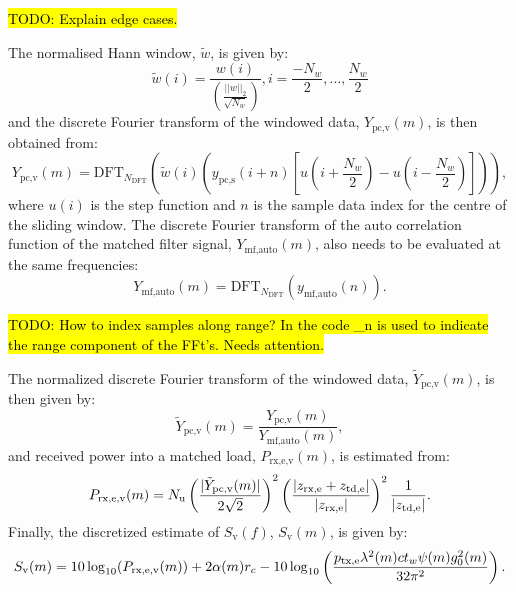 \documentclass[preprint,12pt,TurnOnLineNumbers]{JASAnew}
\newcommand{\freqsym}{f}
\newcommand{\samplesymt}{n}
\newcommand{\samplesymf}{m}
\newcommand{\genidxsym}{i}
\newcommand{\nchannels}{N_{\textrm{u}}}
\newcommand{\zrxe}{z_{\textrm{rx,e}}}
\newcommand{\ztde}{z_{\textrm{td,e}}}
\newcommand{\ptxe}{p_{\textrm{tx,e}}}
\newcommand{\ypcspread}{y_{\textrm{pc,s}}}
\newcommand{\ymfauto}{y_{\textrm{mf,auto}}}
\newcommand{\ypcvolumef}{Y_{\textrm{pc,v}}}
\newcommand{\ypcvolumenormf}{\tilde{Y}_{\textrm{pc,v}}}
\newcommand{\ymfautof}{Y_{\textrm{mf,auto}}}
\newcommand{\prxevf}{P_{\textrm{rx,e,v}}}
\newcommand{\hannw}{w}
\newcommand{\hannwnorm}{\tilde{\hannw}}
\newcommand{\nw}{N_{\hannw}}
\newcommand{\tslide}{t_w}
\newcommand{\sv}{S_{\textrm{v}}}
\newcommand{\range}{r}
\newcommand{\gainzero}{g_0}
\newcommand{\eqang}{\psi}
\newcommand{\wlen}{\lambda}
\newcommand{\cw}{c}
\newcommand{\absorp}{\alpha}
\newcommand{\dft}{\textrm{DFT}}
\newcommand{\ndft}{{N_{\textrm{DFT}}}}
\begin{document}
\hl{TODO: Explain edge cases.}

The normalised Hann window, $\hannwnorm$, is given by: 
%
\begin{equation}
\label{eq:hannw}
\hannwnorm(\genidxsym) = \frac{\hannw(\genidxsym)}{\left( \frac{||\hannw||_2}{\sqrt{\nw}} \right)}, i = \frac{-\nw}{2}, \ldots, \frac{\nw}{2}
\end{equation}
%
and the discrete Fourier transform of the windowed data, $\ypcvolumef(\samplesymf)$, is then obtained from:
%
\begin{equation}
\label{eq:FFT_volume}
\ypcvolumef(\samplesymf) = \dft_\ndft 
\left( \hannwnorm(\genidxsym) \left(\ypcspread (\genidxsym+\samplesymt) \left[ u(\genidxsym + \frac{\nw}{2}) - u(\genidxsym - \frac{\nw}{2}) \right] \right) \right),
\end{equation}
%
where $u(\genidxsym)$ is the step function and $\samplesymt$ is the sample data index for the centre of the sliding window. The discrete Fourier transform of the auto correlation function of the matched filter signal, $\ymfautof(\samplesymf)$, also needs to be evaluated at the same frequencies:
%
\begin{equation}
\label{eq:FFT_TX_Auto}
\ymfautof(\samplesymf)  =  \dft_\ndft (\ymfauto(\samplesymt)).
\end{equation}

%
\hl{TODO: How to index samples along range? In the code \_n is used to indicate the range component of the FFt's. Needs attention.}

The normalized discrete Fourier transform of the windowed data, $\ypcvolumenormf(\samplesymf)$, is then given by:
%
\begin{equation}
\label{eq:FFT_volume_norm}
\ypcvolumenormf(\samplesymf) = \frac{\ypcvolumef(\samplesymf)}{\ymfautof(\samplesymf)},
\end{equation}
%
and received power into a matched load, $\prxevf(\samplesymf)$, is estimated from:
%
\begin{equation}
\label{eq:prx_FFT_volume}
\prxevf(\samplesymf) = \nchannels \left( \frac{|\ypcvolumenormf(\samplesymf)|}{2\sqrt{2}} \right)^2 \left( \frac{|\zrxe+\ztde|}{|\zrxe|}\right)^2 \\
\frac{1}{|\ztde|}. %
\end{equation}
%
Finally, the discretized estimate of $\sv(\freqsym)$, $\sv(\samplesymf)$, is given by:
%
\begin{equation}
\label{eq:Sv_FFT}
\sv(\samplesymf) = 10\log_{10}(\prxevf(\samplesymf)) + 2\absorp(\samplesymf) \range_c \\
- 10\log_{10}\left( \frac{\ptxe \wlen^2(\samplesymf) \cw \tslide \eqang(\samplesymf) \gainzero^2(\samplesymf) }{32\pi^2} \right).
\end{equation}
\end{document}
